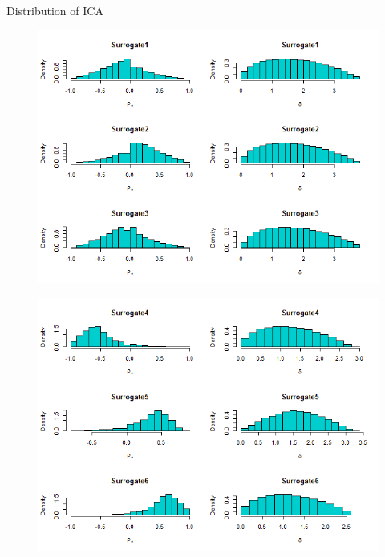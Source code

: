 \documentclass[a4paper,9pt]{beamer}\usepackage[]{graphicx}\usepackage[]{color}
\begin{document}
\begin{frame}{Distribution of ICA}
\begin{minipage}{0.3\textwidth}
\begin{figure}[H]
\includegraphics[scale=0.32]{icaplots1.png}
\end{figure}
\end{minipage}
\hfill
\begin{minipage}{0.40\textwidth}
\begin{figure}[H]
\includegraphics[scale=0.32]{icaplots2.png}
\end{figure}

\end{minipage}


\end{frame}
\end{document}
